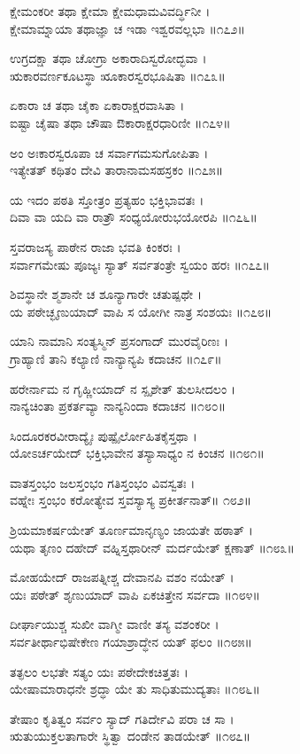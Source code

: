 ಕ್ಷೇಮಂಕರೀ ತಥಾ ಕ್ಷೇಮಾ ಕ್ಷೇಮಧಾಮವಿವರ್ದ್ಧಿನೀ ।\\
ಕ್ಷೇಮಾಮ್ನಾಯಾ ತಥಾಜ್ಞಾ ಚ ಇಡಾ ಇಶ್ವರವಲ್ಲಭಾ ॥೧೭೨॥

ಉಗ್ರದಕ್ಷಾ ತಥಾ ಚೋಗ್ರಾ ಅಕಾರಾದಿಸ್ವರೋದ್ಭವಾ ।\\
ಋಕಾರವರ್ಣಕೂಟಸ್ಥಾ ೠಕಾರಸ್ವರಭೂಷಿತಾ ॥೧೭೩॥

ಏಕಾರಾ ಚ ತಥಾ ಚೈಕಾ ಏಕಾರಾಕ್ಷರವಾಸಿತಾ ।\\
ಐಷ್ಟಾ ಚೈಷಾ ತಥಾ ಚೌಷಾ ಔಕಾರಾಕ್ಷರಧಾರಿಣೀ ॥೧೭೪॥

ಅಂ ಅಃಕಾರಸ್ವರೂಪಾ ಚ ಸರ್ವಾಗಮಸುಗೋಪಿತಾ ।\\
ಇತ್ಯೇತತ್ ಕಥಿತಂ ದೇವಿ ತಾರಾನಾಮಸಹಸ್ರಕಂ ॥೧೭೫॥

ಯ ಇದಂ ಪಠತಿ ಸ್ತೋತ್ರಂ ಪ್ರತ್ಯಹಂ ಭಕ್ತಿಭಾವತಃ ।\\
ದಿವಾ ವಾ ಯದಿ ವಾ ರಾತ್ರೌ ಸಂಧ್ಯಯೋರುಭಯೋರಪಿ ॥೧೭೬॥

ಸ್ತವರಾಜಸ್ಯ ಪಾಠೇನ ರಾಜಾ ಭವತಿ ಕಿಂಕರಃ ।\\
ಸರ್ವಾಗಮೇಷು ಪೂಜ್ಯಃ ಸ್ಯಾತ್ ಸರ್ವತಂತ್ರೇ ಸ್ವಯಂ ಹರಃ ॥೧೭೭॥

ಶಿವಸ್ಥಾನೇ ಶ್ಮಶಾನೇ ಚ ಶೂನ್ಯಾಗಾರೇ ಚತುಷ್ಪಥೇ ।\\
ಯ ಪಠೇಚ್ಛೃಣುಯಾದ್ ವಾಪಿ ಸ ಯೋಗೀ ನಾತ್ರ ಸಂಶಯಃ ॥೧೭೮॥

ಯಾನಿ ನಾಮಾನಿ ಸಂತ್ಯಸ್ಮಿನ್ ಪ್ರಸಂಗಾದ್ ಮುರವೈರಿಣಃ ।\\
ಗ್ರಾಹ್ಯಾಣಿ ತಾನಿ ಕಲ್ಯಾಣಿ ನಾನ್ಯಾನ್ಯಪಿ ಕದಾಚನ ॥೧೭೯॥

ಹರೇರ್ನಾಮ ನ ಗೃಹ್ಣೀಯಾದ್ ನ ಸ್ಪೃಶೇತ್ ತುಲಸೀದಲಂ ।\\
ನಾನ್ಯಚಿಂತಾ ಪ್ರಕರ್ತವ್ಯಾ ನಾನ್ಯನಿಂದಾ ಕದಾಚನ ॥೧೮೦॥

ಸಿಂದೂರಕರವೀರಾದ್ಯೈಃ ಪುಷ್ಪೈರ್ಲೋಹಿತಕೈಸ್ತಥಾ ।\\
ಯೋಽರ್ಚಯೇದ್ ಭಕ್ತಿಭಾವೇನ ತಸ್ಯಾಸಾಧ್ಯಂ ನ ಕಿಂಚನ ॥೧೮೧॥

ವಾತಸ್ತಂಭಂ ಜಲಸ್ತಂಭಂ ಗತಿಸ್ತಂಭಂ ವಿವಸ್ವತಃ ।\\
ವಹ್ನೇಃ ಸ್ತಂಭಂ ಕರೋತ್ಯೇವ ಸ್ತವಸ್ಯಾಸ್ಯ ಪ್ರಕೀರ್ತನಾತ್॥
೧೮೨॥

ಶ್ರಿಯಮಾಕರ್ಷಯೇತ್ ತೂರ್ಣಮಾನೃಣ್ಯಂ ಜಾಯತೇ ಹಠಾತ್ ।\\
ಯಥಾ ತೃಣಂ ದಹೇದ್ ವಹ್ನಿಸ್ತಥಾರೀನ್ ಮರ್ದಯೇತ್ ಕ್ಷಣಾತ್ ॥೧೮೩॥

ಮೋಹಯೇದ್ ರಾಜಪತ್ನೀಶ್ಚ ದೇವಾನಪಿ ವಶಂ ನಯೇತ್ ।\\
ಯಃ ಪಠೇತ್ ಶೃಣುಯಾದ್ ವಾಪಿ ಏಕಚಿತ್ತೇನ ಸರ್ವದಾ ॥೧೮೪॥

ದೀರ್ಘಾಯುಶ್ಚ ಸುಖೀ ವಾಗ್ಮೀ ವಾಣೀ ತಸ್ಯ ವಶಂಕರೀ ।\\
ಸರ್ವತೀರ್ಥಾಭಿಷೇಕೇಣ ಗಯಾಶ್ರಾದ್ಧೇನ ಯತ್ ಫಲಂ ॥೧೮೫॥

ತತ್ಫಲಂ ಲಭತೇ ಸತ್ಯಂ ಯಃ ಪಠೇದೇಕಚಿತ್ತತಃ ।\\
ಯೇಷಾಮಾರಾಧನೇ ಶ್ರದ್ಧಾ ಯೇ ತು ಸಾಧಿತುಮುದ್ಯತಾಃ ॥೧೮೬॥

ತೇಷಾಂ ಕೃತಿತ್ವಂ ಸರ್ವಂ ಸ್ಯಾದ್ ಗತಿರ್ದೇವಿ ಪರಾ ಚ ಸಾ ।\\
ಋತುಯುಕ್ತಲತಾಗಾರೇ ಸ್ಥಿತ್ವಾ ದಂಡೇನ ತಾಡಯೇತ್ ॥೧೮೭॥

